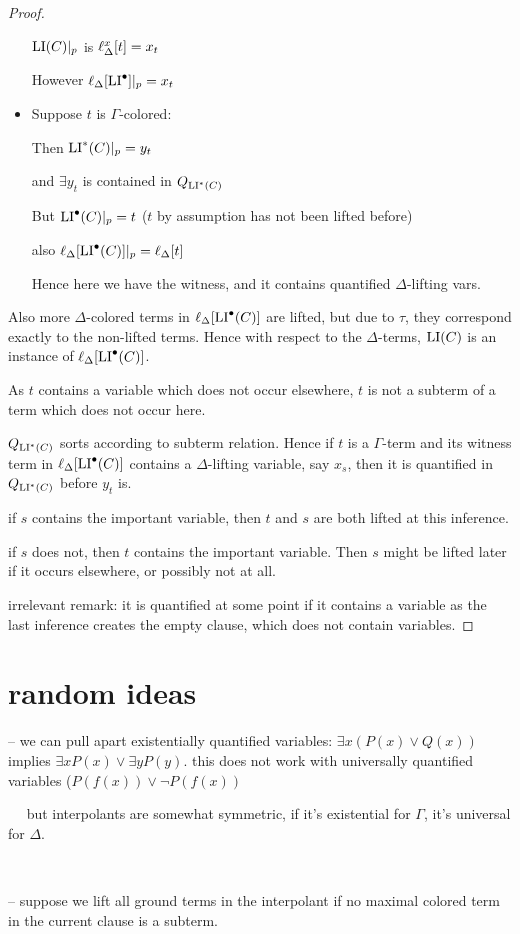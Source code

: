 \documentclass[,%
	draft=false,%
	numbers=noendperiod
	11pt,
	a4paper,
	oneside,%
	openany,
]{memoir}
\begin{document}
\begin{proof}
\begin{itemize}
			$\operatorname{LI}(C)|_{p}$ is $\ell_{\Delta}^{x}[t] = x_t$

			However 
			$\ell_{\Delta}[\operatorname{LI}^\bullet]|_{p} = x_t$

		\item Suppose $t$ is $\Gamma$-colored:

			Then
			$\operatorname{LI}^*(C)|_{p} = y_t$

			and $\exists y_t$ is contained in $Q_{\operatorname{LI}^*(C)}$

			But 
			$\operatorname{LI}^\bullet(C)|_{p} = t$ ($t$ by assumption has not been lifted before)

			also $\ell_{\Delta}[\operatorname{LI}^\bullet(C)]|_{p} = \ell_{\Delta}[t]$

			Hence here we have the witness, and it contains quantified $\Delta$-lifting vars.

	\end{itemize}

	Also more $\Delta$-colored terms in $\ell_{\Delta}[\operatorname{LI}^\bullet(C)]$ are lifted, but due to $\tau$, they correspond exactly to the non-lifted terms.
	Hence with respect to the $\Delta$-terms, $\operatorname{LI}(C)$ is an instance of $\ell_{\Delta}[\operatorname{LI}^\bullet(C)]$.

	As $t$ contains a variable which does not occur elsewhere, $t$ is not a subterm of a term which does not occur here.

	$Q_{\operatorname{LI}^*(C)}$ sorts according to subterm relation.
	Hence if $t$ is a $\Gamma$-term and its witness term in $\ell_{\Delta}[\operatorname{LI}^\bullet(C)]$ contains a $\Delta$-lifting variable, say $x_s$, then it is quantified in $Q_{\operatorname{LI}^*(C)}$ before $y_t$ is.

	if $s$ contains the important variable, then $t$ and $s$ are both lifted at this inference.

	if $s$ does not, then $t$ contains the important variable.
	Then $s$ might be lifted later if it occurs elsewhere, or possibly not at all.

	irrelevant remark: it is quantified at some point if it contains a variable as the last inference creates the empty clause, which does not contain variables.
\end{proof}



\section{random ideas}

-- we can pull apart existentially quantified variables: $\exists x (P(x) \lor Q(x))$ implies $\exists x P(x) \lor \exists y P(y)$. this does not work with universally quantified variables ($P(f(x)) \lor \lnot P(f(x))$

$\quad$ but interpolants are somewhat symmetric, if it's existential for $\Gamma$, it's universal for $\Delta$.

~

-- suppose we lift all ground terms in the interpolant if no maximal colored term in the current clause is a subterm.
\end{document}
